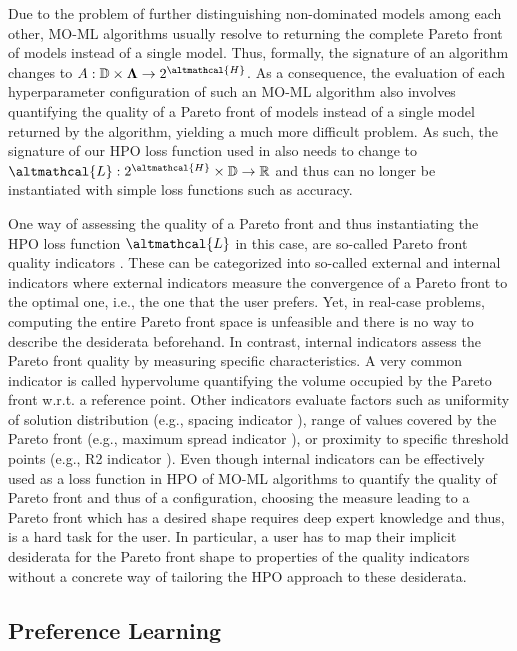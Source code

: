 Due to the problem of further distinguishing non-dominated models among each other, MO-ML algorithms usually resolve to returning the complete Pareto front of models instead of a single model. Thus, formally, the signature of an algorithm changes to $A: \mathbb{D} \times \vec{\Lambda} \rightarrow 2^{\altmathcal{H}}$. As a consequence, the evaluation of each hyperparameter configuration of such an MO-ML algorithm also involves quantifying the quality of a Pareto front of models instead of a single model returned by the algorithm, yielding a much more difficult problem. As such, the signature of our HPO loss function used in  also needs to change to $\altmathcal{L}: 2^{\altmathcal{H}} \times \mathbb{D} \rightarrow \mathbb{R}$ and thus can no longer be instantiated with simple loss functions such as accuracy. 

One way of assessing the quality of a Pareto front and thus instantiating the HPO loss function $\altmathcal{L}$ in this case, are so-called Pareto front quality indicators \cite{audet-ejor21}. 
These can be categorized into so-called external and internal indicators where external indicators measure the convergence of a Pareto front to the optimal one, i.e., the one that the user prefers. 
Yet, in real-case problems, computing the entire Pareto front space is unfeasible and there is no way to describe the desiderata beforehand.
In contrast, internal indicators assess the Pareto front quality by measuring specific characteristics. 
A very common indicator is called hypervolume \cite{zitzler1999multiobjective} quantifying the volume occupied by the Pareto front w.r.t. a reference point.
Other indicators evaluate factors such as uniformity of solution distribution (e.g., spacing indicator \cite{schott1995fault}), range of values covered by the Pareto front (e.g., maximum spread indicator \cite{zitzler2000comparison}), or proximity to specific threshold points (e.g., R2 indicator \cite{hansen1994evaluating}).
Even though internal indicators can be effectively used as a loss function in HPO of MO-ML algorithms to quantify the quality of Pareto front and thus of a configuration, choosing the measure leading to a Pareto front which has a desired shape requires deep expert knowledge and thus, is a hard task for the user. In particular, a user has to map their implicit desiderata for the Pareto front shape to properties of the quality indicators without a concrete way of tailoring the HPO approach to these desiderata.

\subsection{Preference Learning}
\label{moo-ssec:preference_learning_related}

